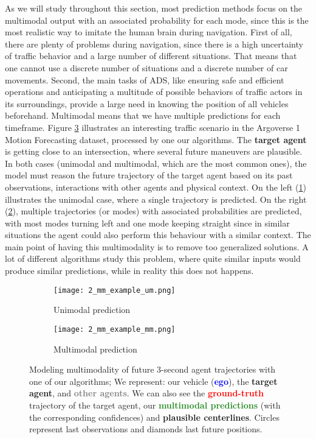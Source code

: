 As we will study throughout this section, most prediction methods focus on the multimodal output with an associated probability for each mode, since this is the most realistic way to imitate the human brain during navigation. First of all, there are plenty of problems during navigation, since there is a high uncertainty of traffic behavior and a large number of different situations. That means that one cannot use a discrete number of situations and a discrete number of car movements. Second, the main tasks of \ac{ADS}, like ensuring safe and efficient operations and anticipating a multitude of possible behaviors of traffic actors in its surroundings, provide a large need in knowing the position of all vehicles beforehand. Multimodal means that we have multiple predictions for each timeframe. Figure \ref{fig:2_um_vs_mm_mp} illustrates an interesting traffic scenario in the Argoverse 1 \cite{chang2019argoverse} Motion Forecasting dataset, processed by one our algorithms. The \textbf{\textcolor{YellowOrange}{target agent}} is getting close to an intersection, where several future maneuvers are plausible. In both cases (unimodal and multimodal, which are the most common ones), the model must reason the future trajectory of the target agent based on its past observations, interactions with other agents and physical context. On the left (\ref{fig:2_um_vs_mm_mp_a}) illustrates the unimodal case, where a single trajectory is predicted. On the right (\ref{fig:2_um_vs_mm_mp_b}), multiple trajectories (or modes) with associated probabilities are predicted, with most modes turning left and one mode keeping straight since in similar situations the agent could also perform this behaviour with a similar context. The main point of having this multimodality is to remove too generalized solutions. A lot of different algorithms study this problem, where quite similar inputs would produce similar predictions, while in reality this does not happens.

\begin{figure}[t!]
	\begin{subfigure}{0.5\textwidth}
		\texttt{[image: 2\_mm\_example\_um.png]}
		\caption{Unimodal prediction}
		\label{fig:2_um_vs_mm_mp_a}
	\end{subfigure}
	\hfill
	\begin{subfigure}{0.5\textwidth}
		\texttt{[image: 2\_mm\_example\_mm.png]}
		\caption{Multimodal prediction}
		\label{fig:2_um_vs_mm_mp_b}
	\end{subfigure}

	\caption[Modeling multimodality of future $3$-second agent trajectories with one of our algorithms]{Modeling multimodality of future $3$-second agent trajectories with one of our algorithms; We represent: our vehicle (\textbf{\textcolor{blue}{ego}}), the \textbf{\textcolor{YellowOrange}{target agent}}, and \textbf{\textcolor{gray}{other agents}}. We can also see the \textbf{\textcolor{red}{ground-truth}} trajectory of the target agent, our \textbf{\textcolor{ForestGreen}{multimodal predictions}} (with the corresponding confidences) and \textbf{plausible centerlines}. Circles represent last observations and diamonds last future positions.}
	\label{fig:2_um_vs_mm_mp}
\end{figure}

